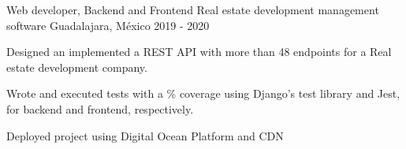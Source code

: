 \begin{cventries}

    \cventry
    {Web developer, Backend and Frontend}
    {Real estate development management software}
    {Guadalajara, México}
    {2019 - 2020}
    {
      \begin{cvitems}
        \item {Designed an implemented a REST API with more than 48 endpoints for a Real estate development company.}
        \item {Wrote and executed tests with a \% coverage  using Django's test library and Jest, for backend and frontend, respectively.}
        \item {Deployed project using Digital Ocean Platform and CDN}
      \end{cvitems}
    }

\end{cventries}

